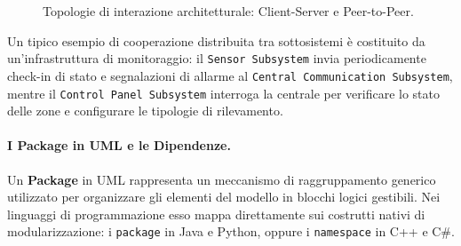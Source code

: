 \documentclass[12pt]{extarticle}
\begin{document}
\begin{figure}[htbp]
\centering
{}
\caption{Topologie di interazione architetturale: Client-Server e Peer-to-Peer.}
\label{fig:client_server_peer}
\end{figure}

\noindent Un tipico esempio di cooperazione distribuita tra sottosistemi è costituito da un'infrastruttura di monitoraggio: il \texttt{Sensor Subsystem} invia periodicamente check-in di stato e segnalazioni di allarme al \texttt{Central Communication Subsystem}, mentre il \texttt{Control Panel Subsystem} interroga la centrale per verificare lo stato delle zone e configurare le tipologie di rilevamento.

\paragraph{I Package in UML e le Dipendenze.}\label{par:uml-dipendenza-package}
Un \textbf{Package} in UML rappresenta un meccanismo di raggruppamento generico utilizzato per organizzare gli elementi del modello in blocchi logici gestibili. Nei linguaggi di programmazione esso mappa direttamente sui costrutti nativi di modularizzazione: i \texttt{package} in Java e Python, oppure i \texttt{namespace} in C++ e C\#.
\end{document}
